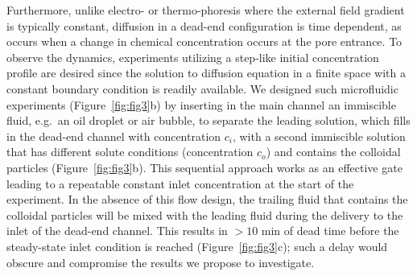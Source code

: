 \documentclass[11pt]{article}
\begin{document}
Furthermore, unlike electro- or thermo-phoresis where the external field
gradient is typically constant, diffusion in a dead-end configuration is
time dependent, as occurs when a change in chemical concentration occurs
at the pore entrance. To observe the dynamics, experiments utilizing a
step-like initial concentration profile are desired since the solution
to diffusion equation in a finite space with a constant boundary
condition is readily available.  We designed such microfluidic
experiments (Figure~\ref{fig:fig3}b) by inserting in the main channel an
immiscible fluid, e.g.~an oil droplet or air bubble, to separate the
leading solution, which fills in the dead-end channel with concentration
$c_i$, with a second immiscible solution that has different solute
conditions (concentration $c_o$) and contains the colloidal particles
(Figure~\ref{fig:fig3}b). This sequential approach works as an effective
gate leading to a repeatable constant inlet concentration at the start
of the experiment. In the absence of this flow design, the trailing
fluid that contains the colloidal particles will be mixed with the
leading fluid during the delivery to the inlet of the dead-end channel.
This results in $> 10$ min of dead time before the steady-state inlet
condition is reached (Figure~\ref{fig:fig3}c); such a delay would
obscure and compromise the results we propose to investigate.

\end{document}
